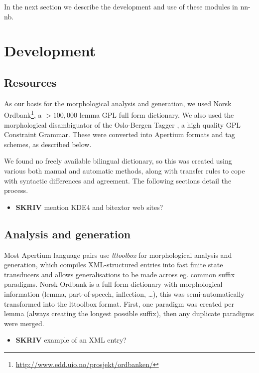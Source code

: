 \documentclass[11pt]{article}
\begin{document}
In the next section we describe the development and use of these
modules in nn-nb.

\section{Development}

  \label{SEC:development}
\subsection{Resources}

As our basis for the morphological analysis and generation, we used
Norsk
Ordbank\footnote{\href{http://www.edd.uio.no/prosjekt/ordbanken/}{http://www.edd.uio.no/prosjekt/ordbanken/}
}, a $>100,000$ lemma GPL full form dictionary. We also used the
morphological disambiguator of the Oslo-Bergen Tagger
\citep{hagen2000cbt}, a high quality GPL Constraint Grammar. These
were converted into Apertium formats and tag schemes, as described
below.

We found no freely available bilingual dictionary, so this was created
using various both manual and automatic methods, along with transfer
rules to cope with syntactic differences and agreement. The following
sections detail the process.
\begin{itemize}

\item \textbf{SKRIV} mention KDE4 and bitextor web sites?\\

\end{itemize} 
\subsection{Analysis and generation}

Most Apertium language pairs use \emph{lttoolbox} for morphological
analysis and generation, which compiles XML-structured entries into
fast finite state transducers and allows generalisations to be made
across eg. common suffix paradigms. Norsk Ordbank is a full form
dictionary with morphological information (lemma, part-of-speech,
inflection, \ldots{}), this was semi-automatically transformed into
the lttoolbox format. First, one paradigm was created per lemma
(always creating the longest possible suffix), then any duplicate
paradigms were merged. \begin{itemize}

\item \textbf{SKRIV} example of an XML entry?\\

\end{itemize} 
\end{document}
